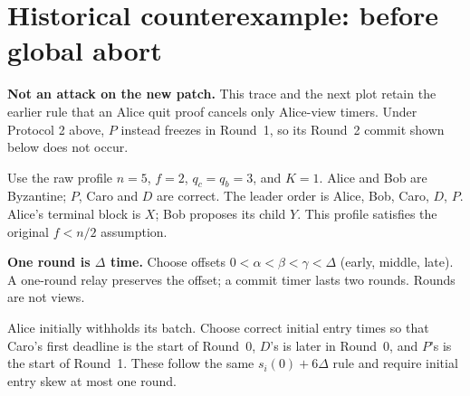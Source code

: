 \documentclass[10pt,a4paper]{article}
\begin{document}
\section*{Historical counterexample: before global abort}
\textbf{Not an attack on the new patch.} This trace and the next plot retain
the earlier rule that an Alice quit proof cancels only Alice-view timers.
Under Protocol 2 above, $P$ instead freezes in Round~1, so its Round~2
commit shown below does not occur.

Use the raw profile $n=5$, $f=2$, $q_c=q_b=3$, and $K=1$.
Alice and Bob are Byzantine; $P$, Caro and $D$ are correct. The leader order
is Alice, Bob, Caro, $D$, $P$. Alice's terminal block is $X$; Bob proposes
its child $Y$. This profile satisfies the original $f<n/2$ assumption.

\textbf{One round is $\Delta$ time.} Choose offsets
$0<\alpha<\beta<\gamma<\Delta$ (early, middle, late). A one-round relay
preserves the offset; a commit timer lasts two rounds. Rounds are not views.

Alice initially withholds its batch. Choose correct initial entry times
so that Caro's first deadline is the start of Round~0, $D$'s is later in
Round~0, and $P$'s is the start of Round~1. These follow the same
$s_i(0)+6\Delta$ rule and require initial entry skew at most one round.
\end{document}
